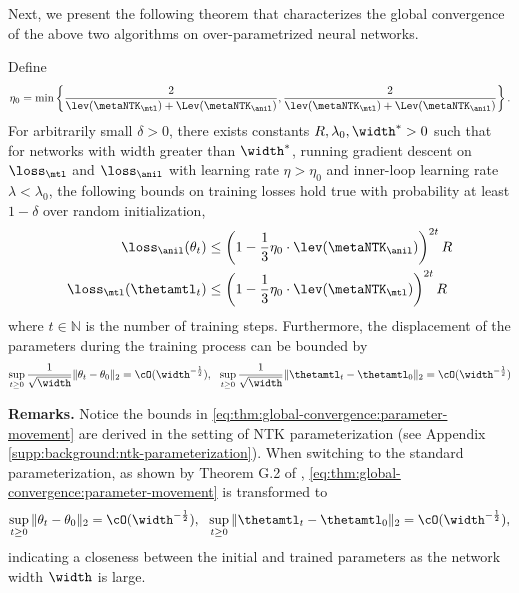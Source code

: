 \documentclass{article}
\begin{document}
Next, we present the following theorem that characterizes the global convergence of the above two algorithms on over-parametrized neural networks.  

\begin{theorem} \label{thm:global-convergence}
Define 
\begin{equation*}
\eta_0 = \min\left\{\frac{2}{\lev(\metaNTK_\mtl)+\Lev(\metaNTK_\anil)},\frac{2}{\lev(\metaNTK_\mtl)+\Lev(\metaNTK_\anil)}\right\}.    
\end{equation*}
For arbitrarily small $\delta > 0 $, there exists constants $R,\lambda_0,\width^* > 0$ such that for networks with width greater than $\width^*$, running gradient descent on $\loss_\mtl$  and $\loss_\anil$ with learning rate $\eta > \eta_0$ and inner-loop learning rate $\lambda < \lambda_0$, the following bounds on training losses hold true with probability at least $1-\delta$ over random initialization,
\begin{align}
    \loss_\anil (\theta_t) &\leq \left(1- \frac{1}{3}\eta_0\cdot \lev(\metaNTK_\anil)\right)^{2t} R \\
    \loss_\mtl (\thetamtl_t) &\leq \left(1- \frac{1}{3}\eta_0\cdot \lev(\metaNTK_\mtl)\right)^{2t} R
\end{align}
where $t\in \mathbb{N}$ is the number of training steps. Furthermore, the displacement of the parameters during the training process can be bounded by
\begin{align}\label{eq:thm:global-convergence:parameter-movement}
    \sup_{t\geq 0} \frac{1}{\sqrt{\width}} \|\theta_t - \theta_0\|_2 = \cO(\width^{-\frac{1}{2}}), ~~\sup_{t\geq 0} \frac{1}{\sqrt{\width}} \|\thetamtl_t - \thetamtl_0\|_2 = \cO(\width^{-\frac{1}{2}})
\end{align}
\end{theorem}
\textbf{Remarks.} Notice the bounds in \eqref{eq:thm:global-convergence:parameter-movement} are derived in the setting of NTK parameterization (see Appendix \ref{supp:background:ntk-parameterization}). When switching to the standard parameterization, as shown by Theorem G.2 of \citet{lee2019wide}, \eqref{eq:thm:global-convergence:parameter-movement} is transformed to 
\begin{align}
    \sup_{t\geq 0} \|\theta_t - \theta_0\|_2 = \cO(\width^{-\frac{1}{2}}), ~~\sup_{t\geq 0} \|\thetamtl_t - \thetamtl_0\|_2 = \cO(\width^{-\frac{1}{2}}),
\end{align}
indicating a closeness between the initial and trained parameters as the network width $\width$ is large.
\end{document}
